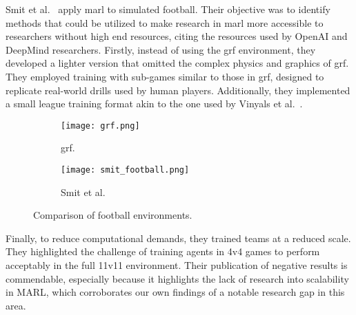 Smit et al.~\cite{smit2023} apply \gls{marl} to simulated football.
Their objective was to identify methods that could be utilized to 
make research in \gls{marl} more accessible to researchers without 
high end resources, citing the resources used by OpenAI and DeepMind 
researchers.
%
Firstly, instead of using the \gls{grf} environment, they developed a 
lighter version that omitted the complex physics and graphics of \gls{grf}. 
They employed training with sub-games similar to those in \gls{grf}, 
designed to replicate real-world drills used by human players. 
Additionally, they implemented a small league training format akin to 
the one used by Vinyals et al.~\cite{vinyals2019}.

\begin{figure}[h]
    \begin{subfigure}{0.5\textwidth}
        \centering
        \texttt{[image: grf.png]}
        \caption{\gls{grf}.}
    \end{subfigure}
    \hfil
    \begin{subfigure}{0.4\textwidth}
        \centering
        \texttt{[image: smit\_football.png]}
        \caption{Smit et al.}
    \end{subfigure}
    \caption{Comparison of football environments.}
\end{figure}

Finally, to reduce computational demands, they trained teams at a 
reduced scale. They highlighted the challenge of training agents in 
4v4 games to perform acceptably in the full 11v11 environment. 
Their publication of negative results is commendable, especially 
because it highlights the lack of research into scalability in MARL, 
which corroborates our own findings of a notable research gap in this area.
